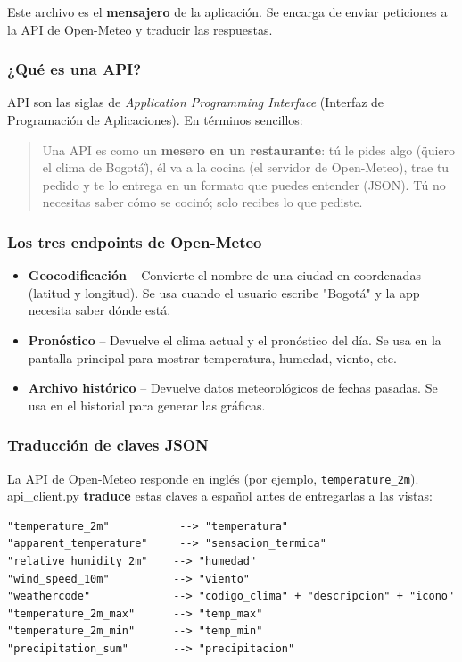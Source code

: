 \documentclass[12pt,a4paper]{article}
\begin{document}
Este archivo es el \textbf{mensajero} de la aplicación. Se encarga de enviar peticiones a la API de Open-Meteo y traducir las respuestas.

\subsubsection*{¿Qué es una API?}

API son las siglas de \textit{Application Programming Interface} (Interfaz de Programación de Aplicaciones). En términos sencillos:

\begin{quote}
Una API es como un \textbf{mesero en un restaurante}: tú le pides algo (\"quiero el clima de Bogotá\"), él va a la cocina (el servidor de Open-Meteo), trae tu pedido y te lo entrega en un formato que puedes entender (JSON). Tú no necesitas saber cómo se cocinó; solo recibes lo que pediste.
\end{quote}

\subsubsection*{Los tres endpoints de Open-Meteo}

\begin{itemize}
    \item \textbf{Geocodificación} -- Convierte el nombre de una ciudad en coordenadas (latitud y longitud). Se usa cuando el usuario escribe "Bogotá" y la app necesita saber dónde está.
    
    \item \textbf{Pronóstico} -- Devuelve el clima actual y el pronóstico del día. Se usa en la pantalla principal para mostrar temperatura, humedad, viento, etc.
    
    \item \textbf{Archivo histórico} -- Devuelve datos meteorológicos de fechas pasadas. Se usa en el historial para generar las gráficas.
\end{itemize}

\subsubsection*{Traducción de claves JSON}

La API de Open-Meteo responde en inglés (por ejemplo, \texttt{temperature\_2m}). api\_client.py \textbf{traduce} estas claves a español antes de entregarlas a las vistas:

\begin{lstlisting}[frame=none, numbers=none, basicstyle=\ttfamily\small]
"temperature_2m"           --> "temperatura"
"apparent_temperature"     --> "sensacion_termica"
"relative_humidity_2m"    --> "humedad"
"wind_speed_10m"          --> "viento"
"weathercode"             --> "codigo_clima" + "descripcion" + "icono"
"temperature_2m_max"      --> "temp_max"
"temperature_2m_min"      --> "temp_min"
"precipitation_sum"       --> "precipitacion"
\end{lstlisting}
\end{document}
